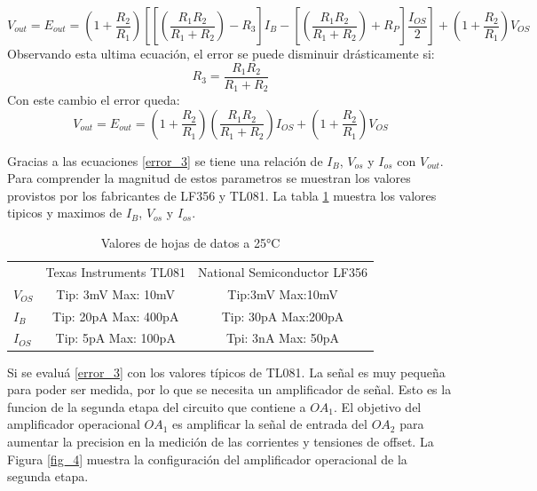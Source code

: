 \begin{equation} V_{out} = E_{out} = (1+\frac{R_2}{R_1})[[(\frac{R_1R_2}{R_1+R_2})-R_3]I_B - [(\frac{R_1R_2}{R_1+R_2})+R_P]\frac {I_{OS}}{2}] + (1+\frac{R_2}{R_1})V_{OS} \end{equation}
    Observando esta ultima ecuación, el error se puede disminuir drásticamente si:
\begin{equation} R_3 = \frac{R_1R_2}{R_1+R_2} \label{arreglo_1}\end{equation}
Con este cambio el error queda:
\begin{equation} V_{out} = E_{out} = (1+\frac{R_2}{R_1})(\frac{R_1R_2}{R_1+R_2})I_{OS} + (1+\frac{R_2}{R_1})V_{OS}  \label{error_3}\end{equation}


Gracias a las ecuaciones \ref{error_3} se tiene una relación  de $I_B$, $V_{os}$ y $I_{os}$ con $V_{out}$. Para comprender la magnitud de estos parametros se muestran los valores provistos por los fabricantes
de LF356 y TL081. La tabla \ref{hoja_datos} muestra los valores tipicos y maximos de $I_B$, $V_{os}$ y $I_{os}$.

\begin{table}[h!]
    \centering
    \caption{Valores de hojas de datos a 25°C}
    \label{hoja_datos}

    \begin{tabular}{@{}lcc@{}}
    & \multicolumn{1}{l}{Texas Instruments TL081} & \multicolumn{1}{r}{National Semiconductor LF356} \\
    \textbf{$V_{OS}$} & Tip: 3mV Max: 10mV      & Tip:3mV Max:10mV             \\
    \textbf{$I_B$}  & Tip: 20pA Max: 400pA    & Tip: 30pA Max:200pA          \\
    \textbf{$I_{OS}$} & Tip: 5pA Max: 100pA     & Tpi: 3nA Max: 50pA          
    \end{tabular}
    \end{table}

    

Si se evaluá \ref{error_3} con los valores típicos de TL081. La señal es muy pequeña para poder ser medida, por lo que se necesita un amplificador de señal. Esto es la funcion de la segunda etapa del circuito que contiene a 
$OA_1$. El objetivo del amplificador operacional $OA_1$ es amplificar la señal de entrada del $OA_2$ para aumentar la precision en la medición de las corrientes y tensiones de offset. La Figura \ref{fig_4} muestra la configuración del amplificador operacional de la segunda etapa.

